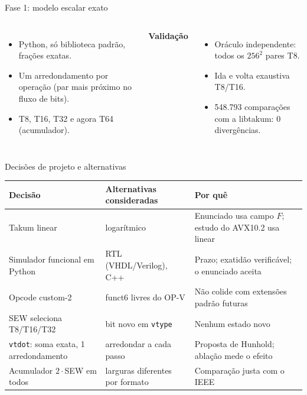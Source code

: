 \documentclass[aspectratio=169,10pt]{beamer}
\newcommand{\code}[1]{\texttt{#1}}
\begin{document}
\begin{frame}{Fase 1: modelo escalar exato}
\begin{columns}
\begin{itemize}
\item Python, só biblioteca padrão, frações exatas.
\item Um arredondamento por operação (par mais próximo no fluxo de bits).
\item T8, T16, T32 e agora T64 (acumulador).
\end{itemize}
\textbf{Validação}
\begin{itemize}
\item Oráculo independente: todos os $256^2$ pares T8.
\item Ida e volta exaustiva T8/T16.
\item 548.793 comparações com a libtakum: 0 divergências.
\end{itemize}
\end{columns}
\end{frame}

\begin{frame}{Decisões de projeto e alternativas}
\small
\begin{tabular}{>{\raggedright\arraybackslash}p{}>{\raggedright\arraybackslash}p{}>{\raggedright\arraybackslash}p{}}
\toprule
Decisão & Alternativas consideradas & Por quê\\
\midrule
Takum linear & logarítmico & Enunciado usa campo $F$; estudo do AVX10.2 usa linear\\
Simulador funcional em Python & RTL (VHDL/Verilog), C++ & Prazo; exatidão verificável; o enunciado aceita\\
Opcode custom-2 & funct6 livres do OP-V & Não colide com extensões padrão futuras\\
SEW seleciona T8/T16/T32 & bit novo em \code{vtype} & Nenhum estado novo\\
\code{vtdot}: soma exata, 1 arredondamento & arredondar a cada passo & Proposta de Hunhold; ablação mede o efeito\\
Acumulador $2\cdot$SEW em todos & larguras diferentes por formato & Comparação justa com o IEEE\\
\bottomrule
\end{tabular}
\end{frame}
\end{document}
